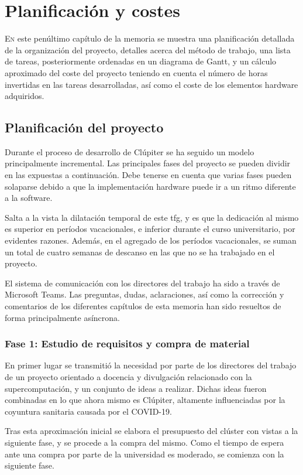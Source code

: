 \chapter{Planificación y costes}
\label{chap:planificacion_costes}

\lettrine{E}{n} este penúltimo capítulo de la memoria se muestra una planificación detallada de la organización del proyecto, detalles acerca del método de trabajo, una lista de tareas, posteriormente ordenadas en un diagrama de Gantt, y un cálculo aproximado del coste del proyecto teniendo en cuenta el número de horas invertidas en las tareas desarrolladas, así como el coste de los elementos hardware adquiridos.

\section{Planificación del proyecto}
Durante el proceso de desarrollo de Clúpiter se ha seguido un modelo principalmente incremental. Las principales fases del proyecto se pueden dividir en las expuestas a continuación. Debe tenerse en cuenta que varias fases pueden solaparse debido a que la implementación hardware puede ir a un ritmo diferente a la software.

Salta a la vista la dilatación temporal de este \acrshort{tfg}, y es que la dedicación al mismo es superior en períodos vacacionales, e inferior durante el curso universitario, por evidentes razones. Además, en el agregado de los períodos vacacionales, se suman un total de cuatro semanas de descanso en las que no se ha trabajado en el proyecto. 

El sistema de comunicación con los directores del trabajo ha sido a través de Microsoft Teams. Las preguntas, dudas, aclaraciones, así como la corrección y comentarios de los diferentes capítulos de esta memoria han sido resueltos de forma principalmente asíncrona.

\subsection{Fase 1: Estudio de requisitos y compra de material}
En primer lugar se transmitió la necesidad por parte de los directores del trabajo de un proyecto orientado a docencia y divulgación relacionado con la supercomputación, y un conjunto de ideas a realizar. Dichas ideas fueron combinadas en lo que ahora mismo es Clúpiter, altamente influenciadas por la coyuntura sanitaria causada por el COVID-19.

Tras esta aproximación inicial se elabora el presupuesto del clúster con vistas a la siguiente fase, y se procede a la compra del mismo. Como el tiempo de espera ante una compra por parte de la universidad es moderado, se comienza con la siguiente fase.

